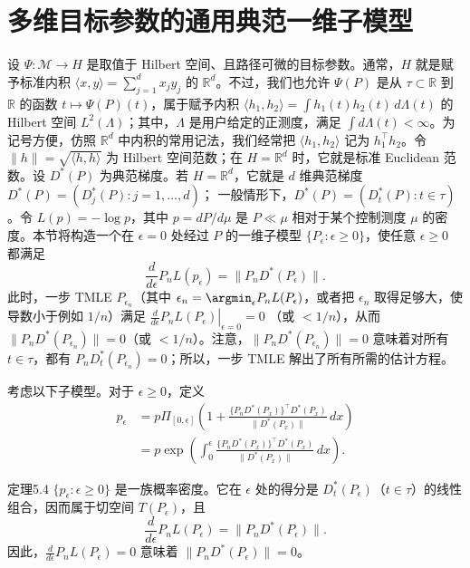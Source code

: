 \section{多维目标参数的通用典范一维子模型}

设 $\Psi:\mathcal M\to H$ 是取值于 Hilbert 空间、且路径可微的目标参数。通常，$H$ 就是赋予标准内积 $\langle x,y\rangle=\sum_{j=1}^d x_jy_j$ 的 $\mathbb R^d$。不过，我们也允许 $\Psi(P)$ 是从 $\tau\subset\mathbb R$ 到 $\mathbb R$ 的函数 $t\mapsto\Psi(P)(t)$，属于赋予内积
$\langle h_1,h_2\rangle=\int h_1(t)h_2(t)\,d\Lambda(t)$
的 Hilbert 空间 $L^2(\Lambda)$；其中，$\Lambda$ 是用户给定的正测度，满足 $\int d\Lambda(t)<\infty$。为记号方便，仿照 $\mathbb R^d$ 中内积的常用记法，我们经常把 $\langle h_1,h_2\rangle$ 记为 $h_1^\top h_2$。令 $\|h\|=\sqrt{\langle h,h\rangle}$ 为 Hilbert 空间范数；在 $H=\mathbb R^d$ 时，它就是标准 Euclidean 范数。设 $D^*(P)$ 为典范梯度。若 $H=\mathbb R^d$，它就是 $d$ 维典范梯度
$D^*(P)=(D_j^*(P):j=1,\ldots,d)$；
一般情形下，$D^*(P)=(D_t^*(P):t\in\tau)$。令 $L(p)=-\log p$，其中 $p=dP/d\mu$ 是 $P\ll\mu$ 相对于某个控制测度 $\mu$ 的密度。本节将构造一个在 $\epsilon=0$ 处经过 $P$ 的一维子模型 $\{P_\epsilon:\epsilon\geq0\}$，使任意 $\epsilon\geq0$ 都满足
\begin{equation}
 \frac{d}{d\epsilon}P_nL(p_\epsilon)=\|P_nD^*(P_\epsilon)\|.
 \tag{5.6}
\end{equation}
此时，一步 TMLE $P_{\epsilon_n}$（其中 $\epsilon_n=\argmin_\epsilon P_nL(P_\epsilon)$，或者把 $\epsilon_n$ 取得足够大，使导数小于例如 $1/n$）满足
$\left.\frac{d}{d\epsilon}P_nL(P_\epsilon)\right|_{\epsilon=0}=0$
（或 $<1/n$），从而 $\|P_nD^*(P_{\epsilon_n})\|=0$（或 $<1/n$）。注意，$\|P_nD^*(P_{\epsilon_n})\|=0$ 意味着对所有 $t\in\tau$，都有 $P_nD_t^*(P_{\epsilon_n})=0$；所以，一步 TMLE 解出了所有所需的估计方程。

考虑以下子模型。对于 $\epsilon\geq0$，定义
\begin{equation}
 \begin{aligned}
 p_\epsilon
 &=p\Pi_{[0,\epsilon]}
 \left(1+\frac{\{P_nD^*(P_x)\}^\top D^*(P_x)}
 {\|D^*(P_x)\|}\,dx\right)\\
 &=p\exp\left(\int_0^\epsilon
 \frac{\{P_nD^*(P_x)\}^\top D^*(P_x)}
 {\|D^*(P_x)\|}\,dx\right).
 \end{aligned}
 \tag{5.7}
\end{equation}

\begin{bookresult}{定理}{5.4}
$\{p_\epsilon:\epsilon\geq0\}$ 是一族概率密度。它在 $\epsilon$ 处的得分是 $D_t^*(P_\epsilon)$（$t\in\tau$）的线性组合，因而属于切空间 $T(P_\epsilon)$，且
\[
 \frac{d}{d\epsilon}P_nL(P_\epsilon)=\|P_nD^*(P_\epsilon)\|.
\]
因此，$\frac{d}{d\epsilon}P_nL(P_\epsilon)=0$ 意味着 $\|P_nD^*(P_\epsilon)\|=0$。
\end{bookresult}

